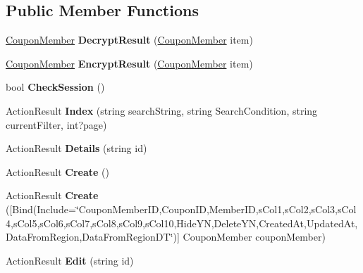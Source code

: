 \subsection*{Public Member Functions}
\begin{DoxyCompactItemize}
\item 
\hyperlink{a00069}{Coupon\+Member} {\bfseries Decrypt\+Result} (\hyperlink{a00069}{Coupon\+Member} item)\hypertarget{a00070_a4b28a110f6f041df49f9325f66c08a65}{}\label{a00070_a4b28a110f6f041df49f9325f66c08a65}

\item 
\hyperlink{a00069}{Coupon\+Member} {\bfseries Encrypt\+Result} (\hyperlink{a00069}{Coupon\+Member} item)\hypertarget{a00070_afbf434179164c6cc949266673faafee2}{}\label{a00070_afbf434179164c6cc949266673faafee2}

\item 
bool {\bfseries Check\+Session} ()\hypertarget{a00070_a275bf58a4d5eff7ede91e87ad325699d}{}\label{a00070_a275bf58a4d5eff7ede91e87ad325699d}

\item 
Action\+Result {\bfseries Index} (string search\+String, string Search\+Condition, string current\+Filter, int?page)\hypertarget{a00070_adf0e90c87a5249434f30f7b392e7d5a0}{}\label{a00070_adf0e90c87a5249434f30f7b392e7d5a0}

\item 
Action\+Result {\bfseries Details} (string id)\hypertarget{a00070_a8636252869c24279e294fd50e0b94b10}{}\label{a00070_a8636252869c24279e294fd50e0b94b10}

\item 
Action\+Result {\bfseries Create} ()\hypertarget{a00070_abedc00f664be9101a31e759e497324bb}{}\label{a00070_abedc00f664be9101a31e759e497324bb}

\item 
Action\+Result {\bfseries Create} (\mbox{[}Bind(Include=\char`\"{}Coupon\+Member\+ID,Coupon\+ID,Member\+ID,s\+Col1,s\+Col2,s\+Col3,s\+Col4,s\+Col5,s\+Col6,s\+Col7,s\+Col8,s\+Col9,s\+Col10,Hide\+YN,Delete\+YN,Created\+At,Updated\+At,Data\+From\+Region,Data\+From\+Region\+DT\char`\"{})\mbox{]} Coupon\+Member coupon\+Member)\hypertarget{a00070_a0581d1a6aa61d1b6b9cbc606b848dd5d}{}\label{a00070_a0581d1a6aa61d1b6b9cbc606b848dd5d}

\item 
Action\+Result {\bfseries Edit} (string id)\hypertarget{a00070_a3e73ff6ddbad554eea64cdd3d6c896b9}{}\label{a00070_a3e73ff6ddbad554eea64cdd3d6c896b9}


\end{DoxyCompactItemize}
